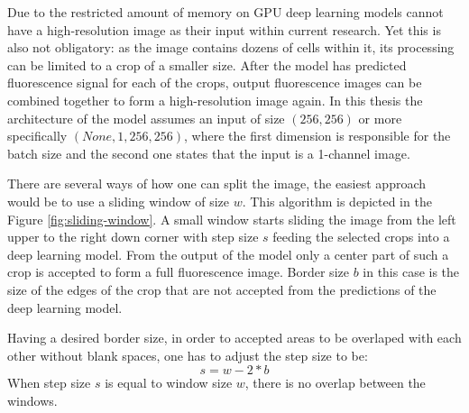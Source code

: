 Due to the restricted amount of memory on GPU deep learning models cannot have a high-resolution image as their input within current research. Yet this is also not obligatory: as the image contains dozens of cells within it, its processing can be limited to a crop of a smaller size. After the model has predicted fluorescence signal for each of the crops, output fluorescence images can be combined together to form a high-resolution image again. In this thesis the architecture of the model assumes an input of size $(256, 256)$ or more specifically $(None, 1, 256, 256)$, where the first dimension is responsible for the batch size and the second one states that the input is a 1-channel image. 

There are several ways of how one can split the image, the easiest approach would be to use a sliding window of size $w$. This algorithm is depicted in the Figure \ref{fig:sliding-window}. A small window starts sliding the image from the left upper to the right down corner with step size $s$ feeding the selected crops into a deep learning model. From the output of the model only a center part of such a crop is accepted to form a full fluorescence image. Border size $b$ in this case is the size of the edges of the crop that are not accepted from the predictions of the deep learning model.

Having a desired border size, in order to accepted areas to be overlaped with each other without blank spaces, one has to adjust the step size to be:
\begin{equation}
  s = w - 2 * b
\end{equation}
When step size $s$ is equal to window size $w$, there is no overlap between the windows.

